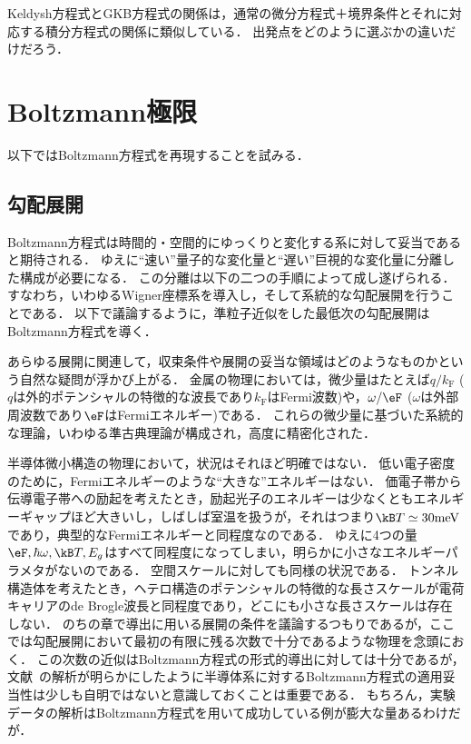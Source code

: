 \documentclass[a4paper,10pt]{jsarticle}
\newcommand{\kF}{k_{\mathrm{F}}}
\begin{document}
Keldysh方程式とGKB方程式の関係は，通常の微分方程式＋境界条件とそれに対応する積分方程式の関係に類似している．
出発点をどのように選ぶかの違いだけだろう．





\section{Boltzmann極限}
以下ではBoltzmann方程式を再現することを試みる．
\subsection{\label{sec:6.1}勾配展開}
Boltzmann方程式は時間的・空間的にゆっくりと変化する系に対して妥当であると期待される．
ゆえに``速い''量子的な変化量と``遅い''巨視的な変化量に分離した構成が必要になる．
この分離は以下の二つの手順によって成し遂げられる．
すなわち，いわゆるWigner座標系を導入し，そして系統的な勾配展開を行うことである．
以下で議論するように，準粒子近似をした最低次の勾配展開はBoltzmann方程式を導く．

あらゆる展開に関連して，収束条件や展開の妥当な領域はどのようなものかという自然な疑問が浮かび上がる．
金属の物理においては，微少量はたとえば$q / \kF$ ($q$は外的ポテンシャルの特徴的な波長であり$\kF$はFermi波数)や，$\omega / \eF$ ($\omega$は外部周波数であり$\eF$はFermiエネルギー)である．
これらの微少量に基づいた系統的な理論，いわゆる準古典理論が構成され，高度に精密化された．

半導体微小構造の物理において，状況はそれほど明確ではない．
低い電子密度のために，Fermiエネルギーのような``大きな''エネルギーはない．
価電子帯から伝導電子帯への励起を考えたとき，励起光子のエネルギーは少なくともエネルギーギャップほど大きいし，しばしば室温を扱うが，それはつまり$\kB T \simeq 30 \mathrm{meV}$であり，典型的なFermiエネルギーと同程度なのである．
ゆえに4つの量$\eF, \hbar \omega, \kB T, E_g$はすべて同程度になってしまい，明らかに小さなエネルギーパラメタがないのである．
空間スケールに対しても同様の状況である．
トンネル構造体を考えたとき，ヘテロ構造のポテンシャルの特徴的な長さスケールが電荷キャリアのde Brogle波長と同程度であり，どこにも小さな長さスケールは存在しない．
のちの章で導出に用いる展開の条件を議論するつもりであるが，ここでは勾配展開において最初の有限に残る次数で十分であるような物理を念頭におく．
この次数の近似はBoltzmann方程式の形式的導出に対しては十分であるが，文献~\cite{Spicka1994,Spicka1995}の解析が明らかにしたように半導体系に対するBoltzmann方程式の適用妥当性は少しも自明ではないと意識しておくことは重要である．
もちろん，実験データの解析はBoltzmann方程式を用いて成功している例が膨大な量あるわけだが．
\end{document}
